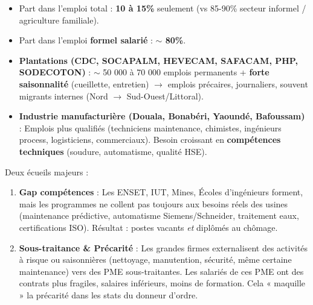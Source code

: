 \documentclass[11pt]{article}
\begin{document}
\begin{aretenir}
\begin{itemize}
    \item Part dans l'emploi total : \textbf{10 à 15\%} seulement (vs 85-90\% secteur informel / agriculture familiale).
    \item Part dans l'emploi \textbf{formel salarié} : \textbf{$\sim$ 80\%}.
    \item \textbf{Plantations (CDC, SOCAPALM, HEVECAM, SAFACAM, PHP, SODECOTON)} : $\sim$ 50 000 à 70 000 emplois permanents + \textbf{forte saisonnalité} (cueillette, entretien) $\to$ emplois précaires, journaliers, souvent migrants internes (Nord $\to$ Sud-Ouest/Littoral).
    \item \textbf{Industrie manufacturière (Douala, Bonabéri, Yaoundé, Bafoussam)} : Emplois plus qualifiés (techniciens maintenance, chimistes, ingénieurs process, logisticiens, commerciaux). Besoin croissant en \textbf{compétences techniques} (soudure, automatisme, qualité HSE).
\end{itemize}
\end{aretenir}

\begin{attention}
Deux écueils majeurs :
\begin{enumerate}
    \item \textbf{Gap compétences} : Les ENSET, IUT, Mines, Écoles d'ingénieurs forment, mais les programmes ne collent pas toujours aux besoins réels des usines (maintenance prédictive, automatisme Siemens/Schneider, traitement eaux, certifications ISO). Résultat : postes vacants \emph{et} diplômés au chômage.
    \item \textbf{Sous-traitance \& Précarité} : Les grandes firmes externalisent des activités à risque ou saisonnières (nettoyage, manutention, sécurité, même certaine maintenance) vers des PME sous-traitantes. Les salariés de ces PME ont des contrats plus fragiles, salaires inférieurs, moins de formation. Cela « maquille » la précarité dans les stats du donneur d'ordre.
\end{enumerate}
\end{attention}
\end{document}
